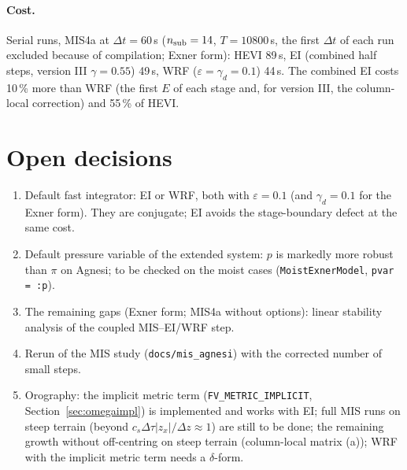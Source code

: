 \documentclass[11pt,a4paper]{article}
\newcommand{\dtau}{\Delta\tau}
\newcommand{\code}[1]{\texttt{\small #1}}
\begin{document}
\paragraph{Cost.} Serial runs, MIS4a at $\Delta t=60$\,s ($n_{\rm sub}=14$, $T=10800$\,s, the first $\Delta t$ of each
run excluded because of compilation; Exner form): HEVI 89\,s, EI (combined half steps, version III $\gamma=0.55$)
49\,s, WRF ($\varepsilon=\gamma_d=0.1$) 44\,s. The combined EI costs 10\,\% more than WRF (the first $E$ of each stage and, for
version III, the column-local correction) and 55\,\% of HEVI.

\section{Open decisions}
\begin{enumerate}
\item Default fast integrator: EI or WRF, both with $\varepsilon=0.1$ (and $\gamma_d=0.1$ for the Exner form). They are
conjugate; EI avoids the stage-boundary defect at the same cost.
\item Default pressure variable of the extended system: $p$ is markedly more robust than $\pi$ on
Agnesi; to be checked on the moist cases (\code{MoistExnerModel}, \code{pvar = :p}).
\item The remaining gaps (Exner form; MIS4a without options): linear stability analysis of the coupled
MIS--EI/WRF step.
\item Rerun of the MIS study (\code{docs/mis\_agnesi}) with the corrected number of small steps.
\item Orography: the implicit metric term (\code{FV\_METRIC\_IMPLICIT}, Section~\ref{sec:omegaimpl}) is implemented and
works with EI; full MIS runs on steep terrain (beyond $c_s\dtau|z_x|/\Delta z\approx1$) are still to be done; the
remaining growth without off-centring on steep terrain (column-local matrix (a)); WRF with the implicit
metric term needs a $\delta$-form.
\end{enumerate}
\end{document}
